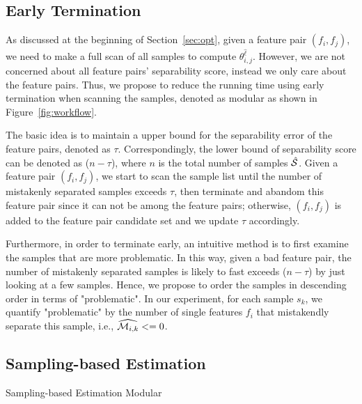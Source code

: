 \subsection{Early Termination} \label{ssec:earlyT}
As discussed at the beginning of Section~\ref{sec:opt}, given a feature pair $(f_i,f_j)$, we need to make a full scan of all samples to compute $\theta_{i,j}^{\hat{\ell}}$. However, we are not concerned about all feature pairs' separability score, instead we only care about the \topk feature pairs. Thus, we propose to reduce the running time using early termination when scanning the samples, denoted as \earlyT modular as shown in Figure~\ref{fig:workflow}.

 The basic idea is to maintain a upper bound for the separability error of the \topk feature pairs, denoted as $\tau$. Correspondingly, the lower bound of separability score can be denoted as ($n-\tau$), where $n$ is the total number of samples $\hat{\sss}$. Given a feature pair $(f_i,f_j)$, we start to scan the sample list until the number of mistakenly separated samples exceeds $\tau$, then terminate and abandom this feature pair since it can not be among the \topk feature pairs; otherwise, $(f_i,f_j)$ is added to the feature pair candidate set and we update $\tau$ accordingly.

 Furthermore, in order to terminate early, an intuitive method is to first examine the samples that are more problematic. In this way, given a bad feature pair, the number of mistakenly separated samples is likely to fast exceeds ($n-\tau$) by just looking at a few samples. Hence, we propose to order the samples in descending order in terms of "problematic". In our experiment, for each sample $s_k$, we quantify "problematic" by the number of single features $f_i$ that mistakendly separate this sample, i.e., $\widehat{\mm_{i,k}}<=0$.

\begin{example}
\end{example}

\subsection{Sampling-based Estimation} \label{ssec:sampling}
Sampling-based Estimation
\sampling Modular



